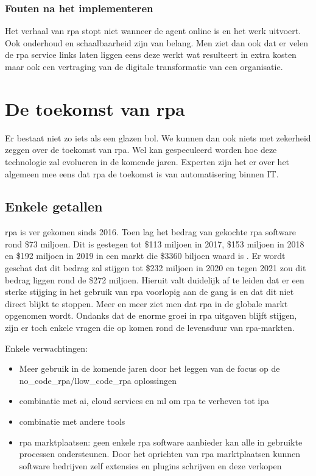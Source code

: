 \subsubsection{Fouten na het implementeren}
Het verhaal van \acrshort{rpa} stopt niet wanneer de agent online is en het werk uitvoert. Ook onderhoud en schaalbaarheid zijn van belang. Men ziet dan ook dat er velen de \acrshort{rpa} service links laten liggen eens deze werkt wat resulteert in extra kosten maar ook een vertraging van de digitale transformatie van een organisatie. \autocite{pitfallsRPA}

\section{De toekomst van \acrshort{rpa}}
Er bestaat niet zo iets als een glazen bol. We kunnen dan ook niets met zekerheid zeggen over de toekomst van \acrshort{rpa}. Wel kan gespeculeerd worden hoe deze technologie zal evolueren in de komende jaren. Experten zijn het er over het algemeen mee eens dat \acrshort{rpa} de toekomst is van automatisering binnen IT. \autocite{futRPA}

\subsection{Enkele getallen}
\acrshort{rpa} is ver gekomen sinds 2016. Toen lag het bedrag van gekochte \acrshort{rpa} software rond \$73 miljoen. Dit is gestegen tot \$113 miljoen in 2017, \$153 miljoen in 2018 en \$192 miljoen in 2019 in een markt die \$3360 biljoen waard is \autocite{ITMarktValue}. Er wordt geschat dat dit bedrag zal stijgen tot \$232 miljoen in 2020 en tegen 2021 zou dit bedrag liggen rond de \$272 miljoen. Hieruit valt duidelijk af te leiden dat er een sterke stijging in het gebruik van \acrshort{rpa} voorlopig aan de gang is en dat dit niet direct blijkt te stoppen. Meer en meer ziet men dat \acrshort{rpa} in de globale markt opgenomen wordt. \autocite{futRPA} Ondanks dat de enorme groei in \acrshort{rpa} uitgaven blijft stijgen, zijn er toch enkele vragen die op komen rond de levensduur van \acrshort{rpa}-markten. \autocite{everythingRPA}

Enkele verwachtingen:
\begin{itemize}
	\item Meer gebruik in de komende jaren door het leggen van de focus op de \gls{no_code_rpa}/l\gls{low_code_rpa} oplossingen 
	\item combinatie met \acrshort{ai}, cloud services en \acrshort{ml} om \acrshort{rpa} te verheven tot \acrshort{ipa}
	\item combinatie met andere tools
	\item \acrshort{rpa} marktplaatsen: geen enkele \acrshort{rpa} software aanbieder kan alle in gebruikte processen ondersteunen. Door het oprichten van \acrshort{rpa} marktplaatsen kunnen software bedrijven zelf extensies en plugins schrijven en deze verkopen
\end{itemize} \autocite{futureRPA}\autocite{everythingRPA}

